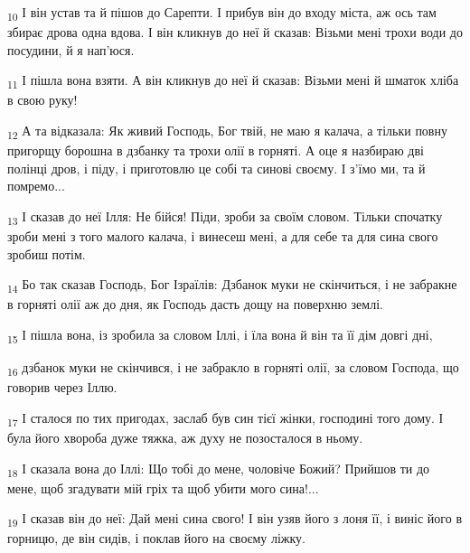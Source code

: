 \begin{tcolorbox}
\textsubscript{10} І він устав та й пішов до Сарепти. І прибув він до входу міста, аж ось там збирає дрова одна вдова. І він кликнув до неї й сказав: Візьми мені трохи води до посудини, й я нап'юся.
\end{tcolorbox}
\begin{tcolorbox}
\textsubscript{11} І пішла вона взяти. А він кликнув до неї й сказав: Візьми мені й шматок хліба в свою руку!
\end{tcolorbox}
\begin{tcolorbox}
\textsubscript{12} А та відказала: Як живий Господь, Бог твій, не маю я калача, а тільки повну пригорщу борошна в дзбанку та трохи олії в горняті. А оце я назбираю дві полінці дров, і піду, і приготовлю це собі та синові своєму. І з'їмо ми, та й помремо...
\end{tcolorbox}
\begin{tcolorbox}
\textsubscript{13} І сказав до неї Ілля: Не бійся! Піди, зроби за своїм словом. Тільки спочатку зроби мені з того малого калача, і винесеш мені, а для себе та для сина свого зробиш потім.
\end{tcolorbox}
\begin{tcolorbox}
\textsubscript{14} Бо так сказав Господь, Бог Ізраїлів: Дзбанок муки не скінчиться, і не забракне в горняті олії аж до дня, як Господь дасть дощу на поверхню землі.
\end{tcolorbox}
\begin{tcolorbox}
\textsubscript{15} І пішла вона, із зробила за словом Іллі, і їла вона й він та її дім довгі дні,
\end{tcolorbox}
\begin{tcolorbox}
\textsubscript{16} дзбанок муки не скінчився, і не забракло в горняті олії, за словом Господа, що говорив через Іллю.
\end{tcolorbox}
\begin{tcolorbox}
\textsubscript{17} І сталося по тих пригодах, заслаб був син тієї жінки, господині того дому. І була його хвороба дуже тяжка, аж духу не позосталося в ньому.
\end{tcolorbox}
\begin{tcolorbox}
\textsubscript{18} І сказала вона до Іллі: Що тобі до мене, чоловіче Божий? Прийшов ти до мене, щоб згадувати мій гріх та щоб убити мого сина!...
\end{tcolorbox}
\begin{tcolorbox}
\textsubscript{19} І сказав він до неї: Дай мені сина свого! І він узяв його з лоня її, і виніс його в горницю, де він сидів, і поклав його на своєму ліжку.
\end{tcolorbox}
